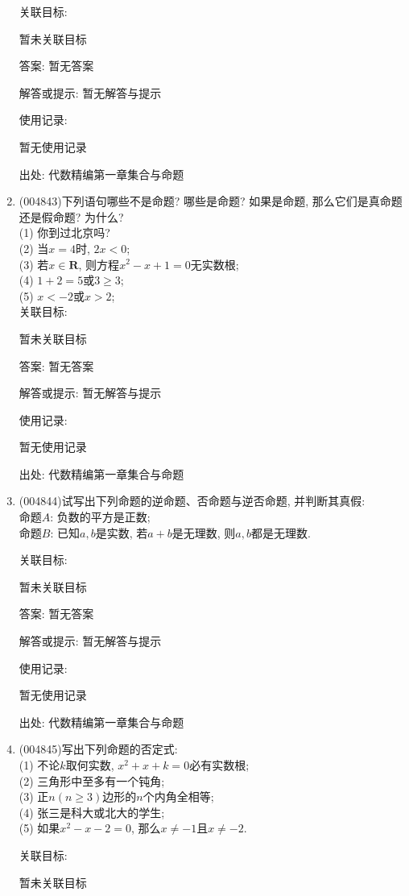 \documentclass[10pt,a4paper]{article}
\begin{document}
\begin{enumerate}[1.]
关联目标:

暂未关联目标

答案: 暂无答案

解答或提示: 暂无解答与提示

使用记录:

暂无使用记录


出处: 代数精编第一章集合与命题
\item { (004843)}下列语句哪些不是命题? 哪些是命题? 如果是命题, 那么它们是真命题还是假命题? 为什么?\\
(1) 你到过北京吗?\\
(2) 当$x=4$时, $2x<0$;\\
(3) 若$x\in \mathbf{R}$, 则方程$x^2-x+1=0$无实数根;\\
(4) $1+2=5$或$3\ge 3$;\\
(5) $x<-2$或$x>2$;\\


关联目标:

暂未关联目标

答案: 暂无答案

解答或提示: 暂无解答与提示

使用记录:

暂无使用记录


出处: 代数精编第一章集合与命题
\item { (004844)}试写出下列命题的逆命题、否命题与逆否命题, 并判断其真假:\\
命题$A$: 负数的平方是正数;\\
命题$B$: 已知$a,b$是实数, 若$a+b$是无理数, 则$a,b$都是无理数.


关联目标:

暂未关联目标

答案: 暂无答案

解答或提示: 暂无解答与提示

使用记录:

暂无使用记录


出处: 代数精编第一章集合与命题
\item { (004845)}写出下列命题的否定式:\\
(1) 不论$k$取何实数, $x^2+x+k=0$必有实数根;\\
(2) 三角形中至多有一个钝角;\\
(3) 正$n(n\ge 3)$边形的$n$个内角全相等;\\
(4) 张三是科大或北大的学生;\\
(5) 如果$x^2-x-2=0$, 那么$x\ne -1$且$x\ne -2$.


关联目标:

暂未关联目标


\end{enumerate}
\end{document}
